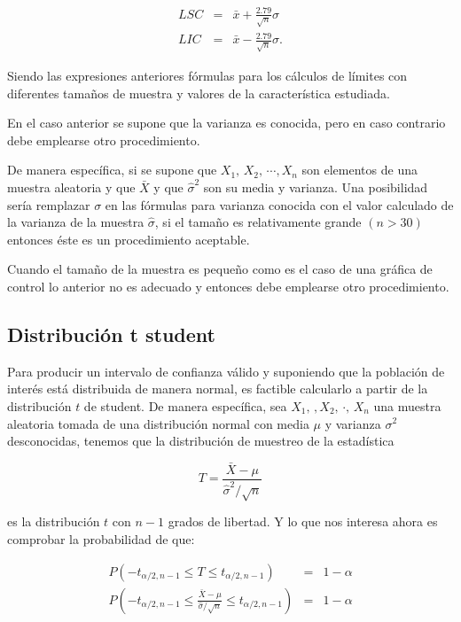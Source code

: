 \documentclass[spanish]{report}
\begin{document}
\begin{eqnarray*}
LSC & = & \bar{x}+\frac{2.79}{\sqrt{n}}\sigma\\
LIC & = & \bar{x}-\frac{2.79}{\sqrt{n}}\sigma.
\end{eqnarray*}


Siendo las expresiones anteriores fórmulas para los cálculos de límites
con diferentes tamaños de muestra y valores de la característica estudiada.

En el caso anterior se supone que la varianza es conocida, pero en caso contrario debe emplearse otro procedimiento.

De manera específica, si se supone que $X_1,\,X_2,\,\cdots,X_n$ son elementos de una muestra aleatoria y que $\bar{X}$ y que $\hat{\sigma}^2$ son su media
y varianza. Una posibilidad sería remplazar $\sigma$ en las fórmulas para varianza conocida con el valor calculado de la varianza de la muestra $\hat{\sigma}$, si el tamaño es relativamente grande $(n > 30)$ entonces éste es un procedimiento aceptable. 

Cuando el tamaño de la muestra es pequeño como es el caso de una gráfica de control lo anterior no es adecuado y entonces debe emplearse otro procedimiento.

\subsection{Distribución t student}

Para producir un intervalo de confianza válido y suponiendo que la población de interés está distribuida de manera normal, es factible calcularlo a partir de la distribución $t$ de student. De manera específica, sea $X_1,\,,X_2,\,\cdot,\,X_n$ una muestra aleatoria tomada de una distribución normal con media $\mu$ y varianza $\sigma^2$ desconocidas, tenemos que la distribución de muestreo de la estadística 

\begin{equation}
T=\frac{\bar{X}-\mu}{\hat{\sigma}^2/\sqrt{n}} 
\label{c2eq8}
\end{equation}

es la distribución $t$ con $n-1$ grados de libertad. Y lo que nos interesa ahora es comprobar la probabilidad de que:

\begin{eqnarray*}
P(-t_{\alpha/2,n-1} \leq T \leq t_{\alpha/2,n-1}) &=&1-\alpha\\
P(-t_{\alpha/2,n-1} \leq \frac{\bar{X}-\mu}{\hat{\sigma}/\sqrt{n}} \leq t_{\alpha/2,n-1}) &=&1-\alpha\\
\end{eqnarray*}
\end{document}
